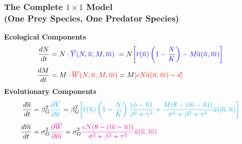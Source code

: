 \documentclass[10pt]{beamer}
\begin{document}
\begin{frame}
	\frametitle{The Complete $1\times1$ Model \\ (One Prey Species, One Predator Species)}
	{\bf Ecological Components}
	\begin{align*}
		\frac{dN}{dt} &= N\cdot {\color{blue}\overline{Y}(N, \overline{n}, M, \overline{m})}\ = N{\color{blue}\left[\overline{r}(\overline{n})\left(1 - \frac{N}{K}\right) - M\overline{a}(\overline{n}, \overline{m})\right]}\\[.1cm]
		\frac{dM}{dt} &= M\cdot {\color{red}\overline{W}(N, \overline{n}, M, \overline{m})} = M{\color{red}\left[eN\overline{a}(\overline{n}, \overline{m}) - d\right]}
	\end{align*}
	{\bf Evolutionary Components}
	\begin{align*}
		\frac{d\overline{n}}{dt} &= \beta_G^2{\color{cyan}\frac{\partial \overline{Y}}{\partial \overline{n}}} = \beta_G^2{\color{cyan}\left[\overline{r}(\overline{n})\left(1 - \frac{N}{K}\right)\frac{(\phi - \overline{n})}{\beta^2 + \gamma^2} + \frac{M(\theta - (\overline{m} - \overline{n}))}{\sigma^2 + \beta^2 + \tau^2} \overline{a}(\overline{m}, \overline{n})\right]}\\[.1cm]
		\frac{d\overline{m}}{dt} &= \sigma_G^2{\color{magenta}\frac{\partial \overline{W}}{\partial \overline{m}}} = \sigma_G^2{\color{magenta}\frac{eN(\theta - (\overline{m} - \overline{n}))}{\sigma^2 + \beta^2 + \tau^2} \overline{a}(\overline{n}, \overline{m})}
	\end{align*}
\end{frame}



\end{document}
